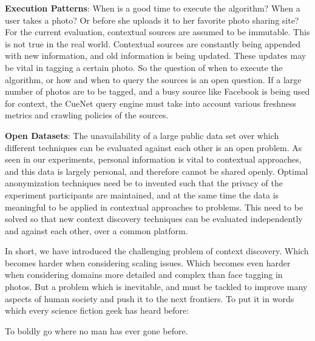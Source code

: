 \textbf{\textbf{Execution Patterns}}: When is a good time to execute the algorithm? When a user takes a photo? Or before she uploads it to her favorite photo sharing site? For the current evaluation, contextual sources are assumed to be immutable. This is not true in the real world. Contextual sources are constantly being appended with new information, and old information is being updated. These updates may be vital in tagging a certain photo. So the question of when to execute the algorithm, or how and when to query the sources is an open question. If a large number of photos are to be tagged, and a busy source like Facebook is being used for context, the CueNet query engine must take into account various freshness metrics and crawling policies of the sources. 

\textbf{\textbf{Open Datasets}}: The unavailability of a large public data set over which different techniques can be evaluated against each other is an open problem. As seen in our experiments, personal information is vital to contextual approaches, and this data is largely personal, and therefore cannot be shared openly. Optimal anonymization techniques need be to invented such that the privacy of the experiment participants are maintained, and at the same time the data is meaningful to be applied in contextual approaches to problems. This need to be solved so that new context discovery techniques can be evaluated independently and against each other, over a common platform.

In short, we have introduced the challenging problem of context discovery. Which becomes harder when considering scaling issues. Which becomes even harder when considering domains more detailed and complex than face tagging in photos. But a problem which is inevitable, and must be tackled to improve many aspects of human society and push it to the next frontiers. To put it in words which every science fiction geek has heard before:

\centering
To boldly go where no man has ever gone before.